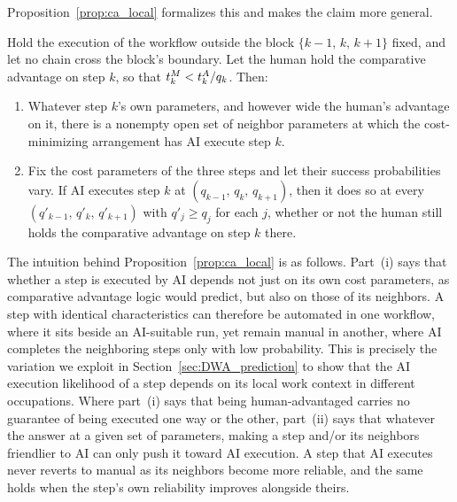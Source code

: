 Proposition~\ref{prop:ca_local} formalizes this and makes the claim more general.

\begin{proposition}
\label{prop:ca_local}
Hold the execution of the workflow outside the block $\{k-1,\, k,\, k+1\}$ fixed, and let no chain cross the block's boundary.
Let the human hold the comparative advantage on step $k$, so that $t^{M}_{k} < t^{A}_{k}/q_k$.
Then:
\begin{enumerate}
\item[(i)] Whatever step $k$'s own parameters, and however wide the human's advantage on it, there is a nonempty open set of neighbor parameters at which the cost-minimizing arrangement has AI execute step $k$.
\item[(ii)] Fix the cost parameters of the three steps and let their success probabilities vary. If AI executes step $k$ at $(q_{k-1},\, q_k,\, q_{k+1})$, then it does so at every $(q'_{k-1},\, q'_k,\, q'_{k+1})$ with $q'_j \geq q_j$ for each $j$, whether or not the human still holds the comparative advantage on step $k$ there.
\end{enumerate}
\end{proposition}

The intuition behind Proposition~\ref{prop:ca_local} is as follows.
Part~(i) says that whether a step is executed by AI depends not just on its own cost parameters, as comparative advantage logic would predict, but also on those of its neighbors.
A step with identical characteristics can therefore be automated in one workflow, where it sits beside an AI-suitable run, yet remain manual in another, where AI completes the neighboring steps only with low probability.
This is precisely the variation we exploit in Section~\ref{sec:DWA_prediction} to show that the AI execution likelihood of a step depends on its local work context in different occupations.
Where part~(i) says that being human-advantaged carries no guarantee of being executed one way or the other, part~(ii) says that whatever the answer at a given set of parameters, making a step and/or its neighbors friendlier to AI can only push it toward AI execution.
A step that AI executes never reverts to manual as its neighbors become more reliable, and the same holds when the step's own reliability improves alongside theirs.

